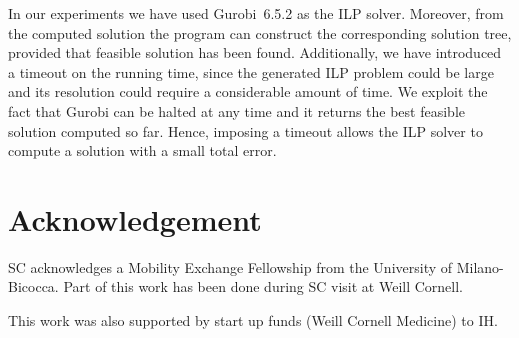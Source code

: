 \documentclass[a4paper,USenglish]{article}
\theoremstyle{definition}
\begin{document}
In our experiments we have used Gurobi~6.5.2 as the ILP solver. 
Moreover, from  the computed  solution the  program can  construct the
  corresponding  solution tree,  provided that  feasible solution  has
  been found. 
Additionally, we have introduced a timeout on the running time, since the
  generated ILP problem could be large and its resolution could require
  a considerable amount of time.
%
We exploit the fact that Gurobi can be halted at any time and it returns the best
  feasible solution computed so far.
%
Hence, imposing a timeout allows the ILP solver to compute a solution with a small
  total error.

\section*{Acknowledgement}
SC acknowledges a Mobility Exchange Fellowship from the University of Milano-Bicocca. Part of this work has been done during SC visit at Weill Cornell.


This work was also supported by start up funds (Weill Cornell Medicine) to IH.

% 
%
%
%
% 
%


\end{document}
